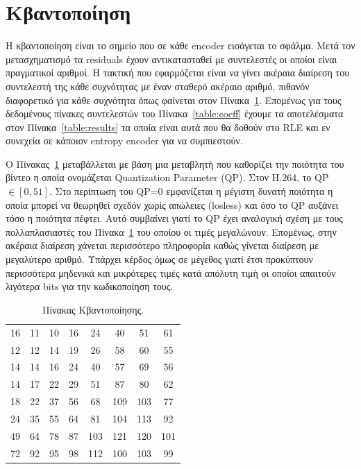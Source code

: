 \newpage
\section{Κβαντοποίηση}
\label{section:sect25}

\indent Η κβαντοποίηση είναι το σημείο που σε κάθε encoder εισάγεται το σφάλμα. Μετά τον μετασχηματισμό τα residuals έχουν αντικατασταθεί με συντελεστές οι οποίοι είναι πραγματικοί αριθμοί. Η τακτική που εφαρμόζεται είναι να γίνει ακέραια διαίρεση του συντελεστή της κάθε συχνότητας με έναν σταθερό ακέραιο αριθμό, πιθανόν διαφορετικό για κάθε συχνότητα όπως φαίνεται στον Πίνακα~\ref{table:quanttable}. Επομένως για τους δεδομένους πίνακες συντελεστών του Πίνακα~\ref{table:coeff} έχουμε τα αποτελέσματα στον Πίνακα~\ref{table:results} τα οποία είναι αυτά που θα δοθούν στο RLE και εν συνεχεία σε κάποιον entropy encoder για να συμπιεστούν.

\indent Ο Πίνακας~\ref{table:quanttable} μεταβάλλεται με βάση μια μεταβλητή που καθορίζει την ποιότητα του βίντεο η οποία ονομάζεται Quantization Parameter (QP). Στον H.264, το QP $\in [0,51] $. Στο περίπτωση του QP=0 εμφανίζεται η μέγιστη δυνατή ποιότητα η οποία μπορεί να θεωρηθεί σχεδόν χωρίς απώλειες (losless) και όσο το QP αυξάνει τόσο η ποιότητα πέφτει. Αυτό συμβαίνει γιατί το QP έχει αναλογική σχέση με τους πολλαπλασιαστές του Πίνακα~\ref{table:quanttable} του οποίου οι τιμές μεγαλώνουν. Επομένως, στην ακέραια διαίρεση χάνεται περισσότερο πληροφορία καθώς γίνεται διαίρεση με μεγαλύτερο αριθμό. Υπάρχει κέρδος όμως σε μέγεθος γιατί έτσι προκύπτουν περισσότερα μηδενικά και μικρότερες τιμές κατά απόλυτη τιμή οι οποίοι απαιτούν λιγότερα bits για την κωδικοποίηση τους.

\begin{table}[H]
    \begin{center}
        \begin{tabular}{| c  c  c  c  c  c  c  c |}
        \hline
        16 & 11 & 10 & 16 & 24 & 40 & 51 & 61 \\
        12 & 12 & 14 & 19 & 26 & 58 & 60 & 55 \\
        14 & 14 & 16 & 24 & 40 & 57 & 69 & 56 \\
        14 & 17 & 22 & 29 & 51 & 87 & 80 & 62 \\
        18 & 22 & 37 & 56 & 68 & 109 & 103 & 77 \\
        24 & 35 & 55 & 64 & 81 & 104 & 113 & 92 \\
        49 & 64 & 78 & 87 & 103 & 121 & 120 & 101 \\
        72 & 92 & 95 & 98 & 112 & 100 & 103 & 99 \\
        \hline
        \end{tabular}
    \end{center}
    \caption{Πίνακας Κβαντοποίησης. \cite{wiki:jpeg}}
    \label{table:quanttable}
\end{table}

